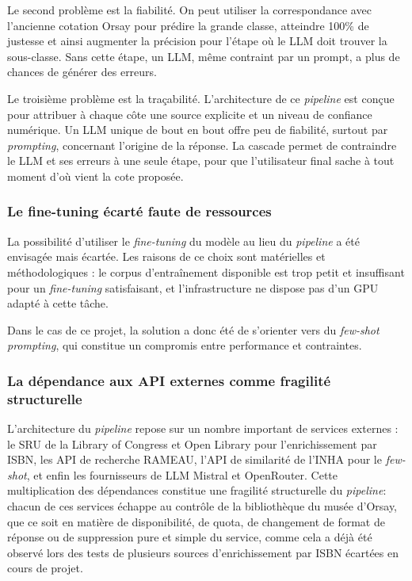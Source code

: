 Le second problème est la fiabilité. On peut utiliser la correspondance avec l'ancienne cotation Orsay pour prédire la grande classe, atteindre 100\% de justesse et ainsi augmenter la précision pour l'étape où le LLM doit trouver la sous-classe. Sans cette étape, un LLM, même contraint par un prompt, a plus de chances de générer des erreurs.

Le troisième problème est la traçabilité. L'architecture de ce \textit{pipeline}  est conçue pour attribuer à chaque côte une source explicite et un niveau de confiance numérique. Un LLM unique de bout en bout offre peu de fiabilité, surtout par \textit{prompting}, concernant l'origine de la réponse. La cascade permet de contraindre le LLM et ses erreurs à une seule étape, pour que l'utilisateur final sache à tout moment d'où vient la cote proposée.


\subsubsection*{Le fine-tuning écarté faute de ressources}
La possibilité d'utiliser le \textit{ fine-tuning}  du modèle au lieu du \textit{pipeline}  a été envisagée mais écartée. Les raisons de ce choix sont matérielles et méthodologiques : le corpus d'entraînement disponible est trop petit et insuffisant pour un \textit{ fine-tuning}  satisfaisant, et l'infrastructure ne dispose pas d'un GPU adapté à cette tâche.

Dans le cas de ce projet, la solution a donc été de s'orienter vers du  \textit{few-shot prompting}, qui constitue un compromis entre performance et contraintes. 


\subsubsection*{La dépendance aux API externes comme fragilité structurelle}

L'architecture du \textit{pipeline}  repose sur un nombre important de services externes : le SRU de la Library of Congress et Open Library pour l'enrichissement par ISBN, les API de recherche RAMEAU, l'API de similarité de l'INHA pour le \textit{few-shot}, et enfin les fournisseurs de LLM Mistral et OpenRouter. Cette multiplication des dépendances constitue une fragilité structurelle du \textit{pipeline}: chacun de ces services échappe au contrôle de la bibliothèque du musée d'Orsay, que ce soit en matière de disponibilité, de quota, de changement de format de réponse ou de suppression pure et simple du service, comme cela a déjà été observé lors des tests de plusieurs sources d'enrichissement par ISBN écartées en cours de projet.


